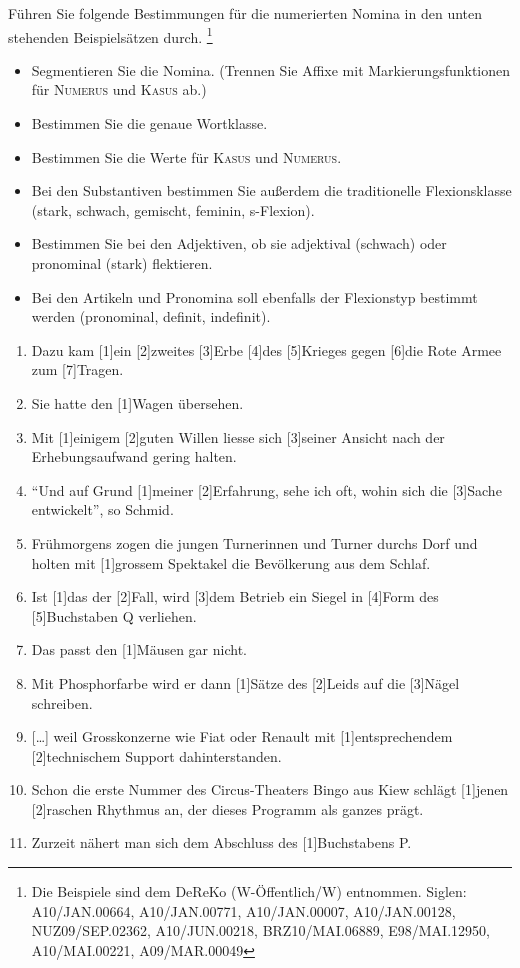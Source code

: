 \begin{sloppypar}

\Uebung \label{u81} Führen Sie folgende Bestimmungen für die numerierten Nomina in den unten stehenden Beispielsätzen durch.%
\footnote{Die Beispiele sind dem DeReKo (W-Öffentlich\slash W) entnommen.
Siglen: A10\slash JAN.00664, A10\slash JAN.00771, A10\slash JAN.00007, A10\slash JAN.00128, NUZ09\slash SEP.02362, A10\slash JUN.00218, BRZ10\slash MAI.06889, E98\slash MAI.12950, A10\slash MAI.00221, A09\slash MAR.00049}

\begin{itemize}\Lf
  \item Segmentieren Sie die Nomina. (Trennen Sie Affixe mit Markierungsfunktionen für \textsc{Numerus} und \textsc{Kasus} ab.)
  \item Bestimmen Sie die genaue Wortklasse.
  \item Bestimmen Sie die Werte für \textsc{Kasus} und \textsc{Numerus}.
  \item Bei den Substantiven bestimmen Sie außerdem die traditionelle Flexionsklasse (stark, schwach, gemischt, feminin, s-Flexion).
  \item Bestimmen Sie bei den Adjektiven, ob sie adjektival (schwach) oder pronominal (stark) flektieren.
  \item Bei den Artikeln und Pronomina soll ebenfalls der Flexionstyp bestimmt werden (pronominal, definit, indefinit).
\end{itemize}

\begin{enumerate}\Lf
  \item Dazu kam [1]ein [2]zweites [3]Erbe [4]des [5]Krieges gegen [6]die Rote Armee zum [7]Tragen.
  \item Sie hatte den [1]Wagen übersehen.
  \item Mit [1]einigem [2]guten Willen liesse sich [3]seiner Ansicht nach der Erhebungsaufwand gering halten.
  \item "`Und auf Grund [1]meiner [2]Erfahrung, sehe ich oft, wohin sich die [3]Sache entwickelt"', so Schmid.
  \item Frühmorgens zogen die jungen Turnerinnen und Turner durchs Dorf und holten mit [1]grossem Spektakel die Bevölkerung aus dem Schlaf.
  \item Ist [1]das der [2]Fall, wird [3]dem Betrieb ein Siegel in [4]Form des [5]Buchstaben Q verliehen.
  \item Das passt den [1]Mäusen gar nicht.
  \item Mit Phosphorfarbe wird er dann [1]Sätze des [2]Leids auf die [3]Nägel schreiben.
  \item{}[\ldots] weil Grosskonzerne wie Fiat oder Renault mit [1]entsprechendem [2]technischem Support dahinterstanden.
  \item Schon die erste Nummer des Circus-Theaters Bingo aus Kiew schlägt [1]jenen [2]raschen Rhythmus an, der dieses Programm als ganzes prägt.
  \item Zurzeit nähert man sich dem Abschluss des [1]Buchstabens P.
\end{enumerate}


\end{sloppypar}
